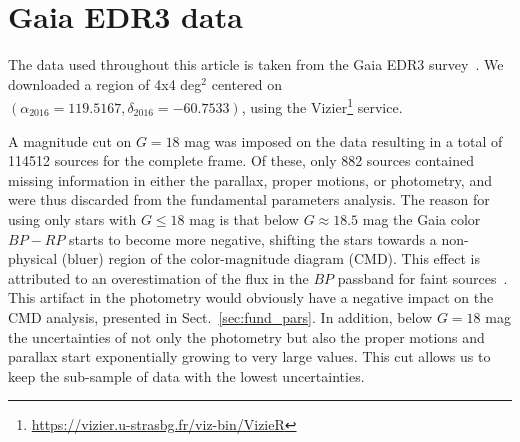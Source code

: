 \documentclass[draft]{aa}
\begin{document}
\section{Gaia EDR3 data}
 \label{sec:data}

 The data used throughout this article is taken from the Gaia EDR3
 survey~\citep{GaiaEDR3_2020}. We downloaded a region of 4x4 deg$^2$ centered
 on $(\alpha_{2016}=119.5167, \delta_{2016}=-60.7533)$, using the
 Vizier\footnote{\url{https://vizier.u-strasbg.fr/viz-bin/VizieR}} service.

 A magnitude cut on $G=18$ mag was imposed on the data resulting in a total of
 114512 sources for the complete frame. Of these, only 882 sources contained
 missing information in either the parallax, proper motions, or photometry,
 and were thus discarded from the fundamental parameters analysis.
 The reason for using only stars with $G\leq18$ mag is that below
 $G\approx18.5$ mag the Gaia color $BP-RP$ starts
 to become more negative, shifting the stars towards a non-physical (bluer)
 region of the color-magnitude diagram (CMD). This effect is attributed
 to an overestimation of the flux in the $BP$ passband for faint
 sources~\citep{Godoy_2021}. This artifact in the photometry would obviously
 have a negative impact on the CMD analysis, presented in
 Sect.~\ref{sec:fund_pars}. In addition, below $G=18$ mag the uncertainties of
 not only the photometry but also the proper motions and parallax start
 exponentially growing to very large values. This cut allows us to keep the
 sub-sample of data with the lowest uncertainties.
\end{document}
